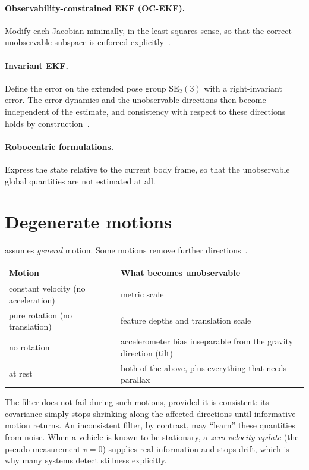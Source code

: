 \paragraph{Observability-constrained EKF (OC-EKF).} Modify each Jacobian minimally, in the least-squares sense, so that the correct
unobservable subspace is enforced explicitly~\cite{hesch2014consistency}.

\paragraph{Invariant EKF.} Define the error on the extended pose group $\mathrm{SE}_2(3)$ with a right-invariant error. The error
dynamics and the unobservable directions then become independent of the estimate, and consistency with respect to these directions
holds by construction~\cite{barrau2017invariant}.

\paragraph{Robocentric formulations.} Express the state relative to the current body frame, so that the unobservable global
quantities are not estimated at all.

\section{Degenerate motions}

 assumes \emph{general} motion. Some motions remove further directions~\cite{yang2019degenerate}.
\begin{center}\small
\begin{tabular}{@{}l l@{}}
\toprule
Motion & What becomes unobservable \\
\midrule
constant velocity (no acceleration) & metric scale \\
pure rotation (no translation) & feature depths and translation scale \\
no rotation & accelerometer bias inseparable from the gravity direction (tilt) \\
at rest & both of the above, plus everything that needs parallax \\
\bottomrule
\end{tabular}
\end{center}
The filter does not fail during such motions, provided it is consistent: its covariance simply stops shrinking along the
affected directions until informative motion returns. An inconsistent filter, by contrast, may ``learn'' these quantities from
noise. When a vehicle is known to be stationary, a \emph{zero-velocity update} (the pseudo-measurement $v = 0$) supplies real
information and stops drift, which is why many systems detect stillness explicitly.

